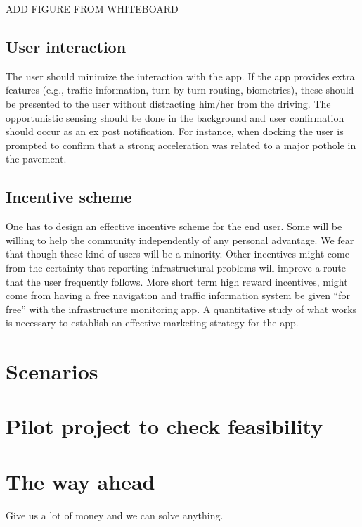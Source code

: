 \documentclass[preprint,12pt]{elsarticle}
\theoremstyle{definition}
\begin{document}
\begin{center}
ADD FIGURE FROM WHITEBOARD
\end{center}


\subsection{User interaction}

The user should minimize the interaction with the app. If the app
provides extra features (e.g., traffic information, turn by turn
routing, biometrics), these should be presented to the user without
distracting him/her from the driving. The opportunistic sensing should
be done in the background and user confirmation should occur as an ex
post notification. For instance, when docking the user is prompted to
confirm that a strong acceleration was related to a major pothole in
the pavement. 


\subsection{Incentive scheme}

One has to design an effective incentive scheme for the end user. Some
will be willing to help the community independently of any personal
advantage. We fear that though these kind of users will be a
minority. Other incentives might come from the certainty that
reporting infrastructural problems will improve a route that the user
frequently follows. More short term high reward incentives, might come
from having a free navigation and traffic information system be given
``for free'' with the infrastructure monitoring app. A quantitative
study of what works is necessary to establish an effective marketing
strategy for the app.


\section{Scenarios}


\section{Pilot project to check feasibility}



\section{The way ahead}

Give us a lot of money and we can solve anything.





\end{document}
